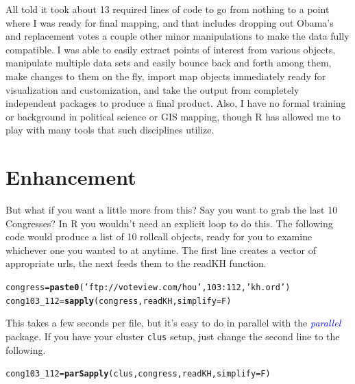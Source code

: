 \documentclass[english,nohyper,titlepage]{tufte-handout}\usepackage[]{graphicx}\usepackage[]{color}
\makeatletter
\newcommand{\hlnum}[1]{\textcolor[rgb]{0.686,0.059,0.569}{#1}}%
\newcommand{\hlstr}[1]{\textcolor[rgb]{0.192,0.494,0.8}{#1}}%
\newcommand{\hlopt}[1]{\textcolor[rgb]{0,0,0}{#1}}%
\newcommand{\hlstd}[1]{\textcolor[rgb]{0.345,0.345,0.345}{#1}}%
\newcommand{\hlkwb}[1]{\textcolor[rgb]{0.69,0.353,0.396}{#1}}%
\newcommand{\hlkwc}[1]{\textcolor[rgb]{0.333,0.667,0.333}{#1}}%
\newcommand{\hlkwd}[1]{\textcolor[rgb]{0.737,0.353,0.396}{\textbf{#1}}}%
\newenvironment{kframe}{%
 \def\at@end@of@kframe{}%
 \ifinner\ifhmode%
  \def\at@end@of@kframe{\end{minipage}}%
  \begin{minipage}{\columnwidth}%
 \fi\fi%
 \def\FrameCommand##1{\hskip\@totalleftmargin \hskip-\fboxsep
 \colorbox{shadecolor}{##1}\hskip-\fboxsep
     \hskip-\linewidth \hskip-\@totalleftmargin \hskip\columnwidth}%
 \MakeFramed {\advance\hsize-\width
   \@totalleftmargin\z@ \linewidth\hsize
   \@setminipage}}%
 {\par\unskip\endMakeFramed%
 \at@end@of@kframe}
\newenvironment{knitrout}{}{} %
\makeatother
\begin{document}
All told it took about 13 required lines of code to go from nothing to a point where I was ready for final mapping, and that includes dropping out Obama's and replacement votes a couple other minor manipulations to make the data fully compatible.  I was able to easily extract points of interest from various objects, manipulate multiple data sets and easily bounce back and forth among them, make changes to them on the fly, import map objects immediately ready for visualization and customization, and take the output from completely independent packages to produce a final product.  Also, I have no formal training or background in political science or GIS mapping, though R has allowed me to play with many tools that such disciplines utilize.

\section{Enhancement}

But what if  you want a little more from this? Say you want to grab the last 10 Congresses?  In R you wouldn't need an explicit loop to do this.  The following code would produce a list of 10 rollcall objects, ready for you to examine whichever one you wanted to at anytime.  The first line creates a vector of appropriate urls, the next feeds them to the readKH function.

\begin{knitrout}\footnotesize
{}\color{fgcolor}\begin{kframe}
\begin{alltt}
\hlstd{congress} \hlkwb{=} \hlkwd{paste0}\hlstd{(}\hlstr{'ftp://voteview.com/hou'}\hlstd{,} \hlnum{103}\hlopt{:}\hlnum{112}\hlstd{,} \hlstr{'kh.ord'}\hlstd{)}
\hlstd{cong103_112} \hlkwb{=} \hlkwd{sapply}\hlstd{(congress, readKH,} \hlkwc{simplify}\hlstd{=F)}
\end{alltt}
\end{kframe}
\end{knitrout}

This takes a few seconds per file, but it's easy to do in parallel with the \emph{\textcolor{blue}{parallel}} package. If you have your cluster \texttt{clus} setup, just change the second line to the following.


\begin{knitrout}\footnotesize
{}\color{fgcolor}\begin{kframe}
\begin{alltt}
\hlstd{cong103_112} \hlkwb{=} \hlkwd{parSapply}\hlstd{(clus, congress, readKH,} \hlkwc{simplify}\hlstd{=F)}
\end{alltt}
\end{kframe}
\end{knitrout}
\end{document}

